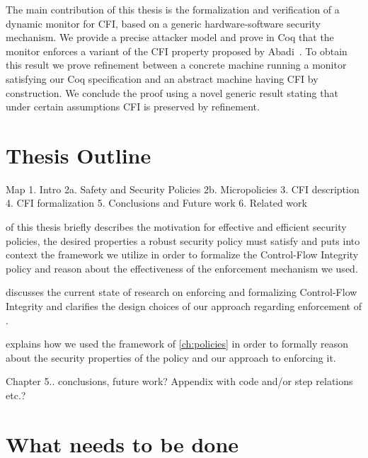 The main contribution of this thesis is the formalization and
verification of a dynamic monitor for CFI, based on a generic
hardware-software security mechanism.
%
We provide a precise attacker model and prove in Coq that the monitor
enforces a variant of the CFI property proposed by
Abadi~\ETAL\cite{AbadiBEL09}.
%
To obtain this result we prove refinement between a concrete
machine running a monitor satisfying our Coq specification
and an abstract machine having CFI by construction.
%
We conclude the proof using a novel generic result stating that under
certain assumptions CFI is preserved by refinement.

\section{Thesis Outline}\label{sec:outline}
Map
1. Intro
2a. Safety and Security Policies
2b. Micropolicies
3. CFI description
4. CFI formalization
5. Conclusions and Future work
6. Related work

 of this thesis briefly describes the motivation for
effective and efficient security policies, the desired properties a
robust security policy must satisfy and puts into context the
framework we utilize in order to formalize the Control-Flow Integrity policy
and reason about the effectiveness of the enforcement mechanism we used.

 discusses the current state of
research on enforcing and formalizing Control-Flow Integrity and clarifies
the design choices of our approach regarding enforcement of \CFI.

 explains how we used the framework of \cref{ch:policies}
in order to formally reason about the security properties of the \CFI policy and
our approach to enforcing it.

Chapter 5.. conclusions, future work? Appendix with code and/or step
relations etc.?

\section{What needs to be done}

